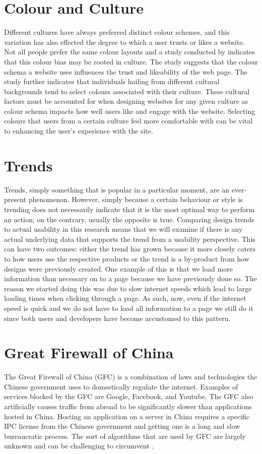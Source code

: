 \section{Colour and Culture}
Different cultures have always preferred distinct colour schemes, and this variation has also effected the degree to which a user trusts or likes a website. Not all people prefer the same colour layouts and a study conducted by \citeauthor{Color} \cite{Color} indicates that this colour bias may be rooted in culture. The study suggests that the colour schema a website uses influences the trust and likeability of the web page. The study further indicates that individuals hailing from different cultural backgrounds tend to select colours associated with their culture. These cultural factors must be accounted for when designing websites for any given culture as colour schema impacts how well users like and engage with the website. Selecting colours that users from a certain culture feel more comfortable with can be vital to enhancing the user's experience with the site.
\section{Trends}
Trends, simply something that is popular in a particular moment, are an ever-present phenomenon. However, simply because a certain behaviour or style is trending does not necessarily indicate that it is the most optimal way to perform an action; on the contrary, usually the opposite is true. Comparing design trends to actual usability in this research means that we will examine if there is any actual underlying data that supports the trend from a usability perspective. This can have two outcomes: either the trend has grown because it more closely caters to how users use the respective products or the trend is a by-product from how designs were previously created. One example of this is that we load more information than necessary on to a page because we have previously done so. The reason we started doing this was due to slow internet speeds which lead to large loading times when clicking through a page. As such, now, even if the internet speed is quick and we do not have to load all information to a page we still do it since both users and developers have become accustomed to this pattern.

\section{Great Firewall of China}
The Great Firewall of China (GFC) is a combination of laws and technologies the Chinese government uses to domestically regulate the internet. Examples of services blocked by the GFC are Google, Facebook, and Youtube. The GFC also artificially causes traffic from abroad to be significantly slower than applications hosted in China. Hosting an application on a server in China requires a specific IPC license from the Chinese government and getting one is a long and slow bureaucratic process. The sort of algorithms that are used by GFC are largely unknown and can be challenging to circumvent \cite{GFC}.
